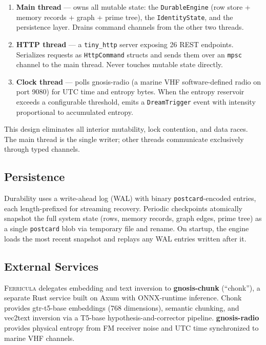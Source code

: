 \documentclass[twocolumn,10pt]{article}
\begin{document}
\begin{enumerate}[leftmargin=*,itemsep=2pt]
\item \textbf{Main thread} --- owns all mutable state: the
  \texttt{DurableEngine} (row store + memory records + graph + prime
  tree), the \texttt{IdentityState}, and the persistence layer.
  Drains command channels from the other two threads.
\item \textbf{HTTP thread} --- a \texttt{tiny\_http} server exposing
  26 REST endpoints.  Serializes requests as \texttt{HttpCommand}
  structs and sends them over an \texttt{mpsc} channel to the main
  thread.  Never touches mutable state directly.
\item \textbf{Clock thread} --- polls gnosis-radio (a marine VHF
  software-defined radio on port 9080) for UTC time and entropy bytes.
  When the entropy reservoir exceeds a configurable threshold,
  emits a \texttt{DreamTrigger} event with intensity proportional
  to accumulated entropy.
\end{enumerate}

\noindent
This design eliminates all interior mutability, lock contention, and
data races.  The main thread is the single writer; other threads
communicate exclusively through typed channels.

\subsection{Persistence}

Durability uses a write-ahead log (WAL) with binary
\texttt{postcard}-encoded entries, each length-prefixed for streaming
recovery.  Periodic checkpoints atomically snapshot the full system
state (rows, memory records, graph edges, prime tree) as a single
\texttt{postcard} blob via temporary file and rename.  On startup,
the engine loads the most recent snapshot and replays any WAL entries
written after it.

\subsection{External Services}

\textsc{Ferricula} delegates embedding and text inversion to
\textbf{gnosis-chunk} (``chonk''), a separate Rust service built on
Axum with ONNX-runtime inference.  Chonk provides gtr-t5-base embeddings
(768 dimensions), semantic chunking, and vec2text inversion via a T5-base
hypothesis-and-corrector pipeline.  \textbf{gnosis-radio} provides
physical entropy from FM receiver noise and UTC time synchronized to
marine VHF channels.
\end{document}
